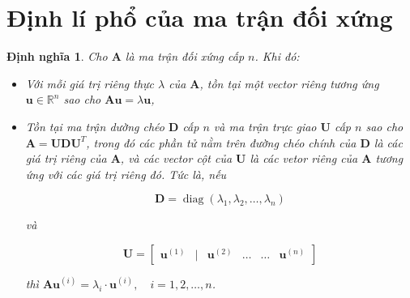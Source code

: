 \documentclass[12pt,a4paper,oneside]{report}
\newtheorem{dn}{Định nghĩa}[section]
\numberwithin{equation}{section}
\begin{document}
%
\section{Định lí phổ của ma trận đối xứng}
\begin{dn} \cite{linh2016} \label{dlpho}
	Cho $\mathbf{A}$ là ma trận đối xứng cấp $n$. Khi đó:
	\begin{itemize}
		\item[(i)] Với mỗi giá trị riêng thực $\lambda$ của $\mathbf{A}$, tồn tại một vector riêng tương ứng $\mathbf{u} \in \mathbb{R}^{n}$ sao cho $\mathbf{A u}=\lambda \mathbf{u}$,
		
		\item[(ii)] Tồn tại ma trận dường chéo $\mathbf{D}$ cấp $n$ và ma trận trực giao $\mathbf{U}$ cấp $n$ sao cho $\mathbf{A}=\mathbf{U D U}^{T}$, trong đó các phần tử nằm trên đường chéo chính của $\mathbf{D}$ là các giá trị riêng của $\mathbf{A}$, và các vector cột của $\mathbf{U}$ là các vetor riêng của $\mathbf{A}$ tương ứng với các giá trị riêng đó. Tức là, nếu
		
		$$
		\mathbf{D}=\operatorname{diag}\left(\lambda_{1}, \lambda_{2}, \ldots, \lambda_{n}\right)
		$$
		
		và
		
		$$
		\mathbf{U}=\left[\begin{array}{lllllll}
			\mathbf{u}^{(1)} & \mid & \mathbf{u}^{(2)} & \ldots & \ldots & \mathbf{u}^{(n)}
		\end{array}\right]
		$$
		
		thì $\mathbf{A} \mathbf{u}^{(i)}=\lambda_{i} \cdot \mathbf{u}^{(i)}, \quad i=1,2, \ldots, n$.
	\end{itemize}
\end{dn}
\end{document}
